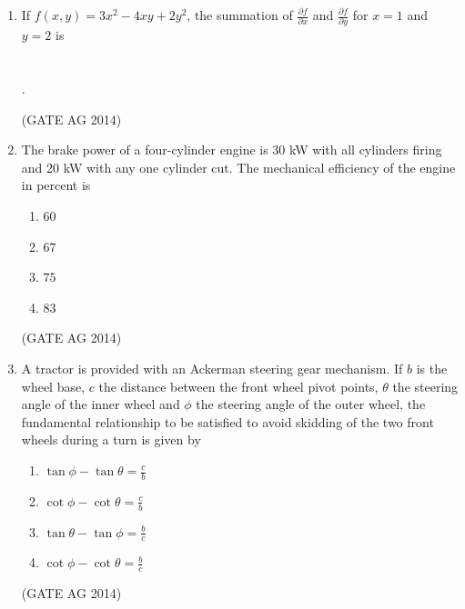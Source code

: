 \documentclass[journal,12pt,onecolumn]{IEEEtran}
\begin{document}
\begin{enumerate}
    \item If $f(x,y) = 3x^2 - 4xy + 2y^2$, the summation of $\frac{\partial f}{\partial x}$ and $\frac{\partial f}{\partial y}$ for $x = 1$ and $y = 2$ is \\\\\\.

    \hfill(GATE AG 2014)

    \item The brake power of a four-cylinder engine is 30 kW with all cylinders firing and 20 kW with any one cylinder cut. The mechanical efficiency of the engine in percent is
    \begin{multicols}{4}
    \begin{enumerate}
        \item $60$
        \item $67$
        \item $75$
        \item $83$
    \end{enumerate}
    \end{multicols}
    \hfill(GATE AG 2014)

    \item A tractor is provided with an Ackerman steering gear mechanism. If $b$ is the wheel base, $c$ the distance between the front wheel pivot points, $\theta$ the steering angle of the inner wheel and $\phi$ the steering angle of the outer wheel, the fundamental relationship to be satisfied to avoid skidding of the two front wheels during a turn is given by
    \begin{enumerate}
        \item $\tan \phi - \tan \theta = \frac{c}{b}$
        \item $\cot \phi - \cot \theta = \frac{c}{b}$
        \item $\tan \theta - \tan \phi = \frac{b}{c}$
        \item $\cot \phi - \cot \theta = \frac{b}{c}$
    \end{enumerate}
    \hfill(GATE AG 2014)


\end{enumerate}
\end{document}
